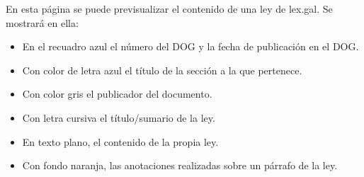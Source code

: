 En esta página se puede previsualizar el contenido de una ley de lex.gal. Se mostrará en ella:
\begin{itemize}
    \item En el recuadro azul el número del DOG y la fecha de publicación en el DOG.
    \item Con color de letra azul el título de la sección a la que pertenece.
    \item Con color gris el publicador del documento.
    \item Con letra cursiva el título/sumario de la ley.
    \item En texto plano, el contenido de la propia ley.
    \item Con fondo naranja, las anotaciones realizadas sobre un párrafo de la ley.
\end{itemize}